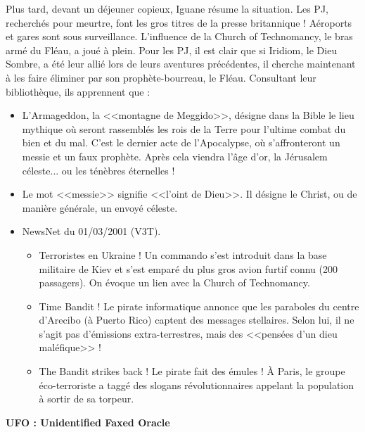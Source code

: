 \documentclass[11pt,twoside,a4paper]{book}
\begin{document}
Plus tard, devant un d{\'e}jeuner copieux, Iguane r{\'e}sume la situation. Les PJ, recherch{\'e}s pour meurtre, font les gros titres de la presse britannique ! A{\'e}roports et gares sont sous surveillance. L'influence de la Church of Technomancy, le bras arm{\'e} du Fl{\'e}au, a jou{\'e} {\`a} plein. Pour les PJ, il est clair que si Iridiom, le Dieu Sombre, a {\'e}t{\'e} leur alli{\'e} lors de leurs aventures pr{\'e}c{\'e}dentes, il cherche maintenant {\`a} les faire {\'e}liminer par son proph{\`e}te-bourreau, le Fl{\'e}au. Consultant leur biblioth{\`e}que, ils apprennent que : %
\setlength\parindent{20pt}
\begin{itemize}
	\item L'Armageddon, la <<montagne de Meggido>>, d{\'e}signe dans la Bible le lieu mythique o{\`u} seront rassembl{\'e}s les rois de la Terre pour l'ultime combat du bien et du mal. C'est le dernier acte de l'Apocalypse, o{\`u} s'affronteront un messie et un faux proph{\`e}te. Apr{\`e}s cela viendra l'{\^a}ge d'or, la J{\'e}rusalem c{\'e}leste... ou les t{\'e}n{\`e}bres {\'e}ternelles !
	\item Le mot <<messie>> signifie <<l'oint de Dieu>>. Il d{\'e}signe le Christ, ou de mani{\`e}re g{\'e}n{\'e}rale, un envoy{\'e} c{\'e}leste.
	\item NewsNet du 01/03/2001 (V3T).
	\begin{itemize}
		\item Terroristes en Ukraine ! Un commando s'est introduit dans la base militaire de Kiev et s'est empar{\'e} du plus gros avion furtif connu (200 passagers). On {\'e}voque un lien avec la Church of Technomancy.
		\item Time Bandit ! Le pirate informatique annonce que les paraboles du centre d'Arecibo ({\`a} Puerto Rico) captent des messages stellaires. Selon lui, il ne s'agit pas d'{\'e}missions extra-terrestres, mais des <<pens{\'e}es d'un dieu mal{\'e}fique>> !
		\item The Bandit strikes back ! Le pirate fait des {\'e}mules ! {\`A} Paris, le groupe {\'e}co-terroriste a tagg{\'e} des slogans r{\'e}volutionnaires appelant la population {\`a} sortir de sa torpeur.
	\end{itemize}
\end{itemize} %
\setlength\parindent{0pt}


\textbf{\large UFO : Unidentified Faxed Oracle}~\\
\end{document}
